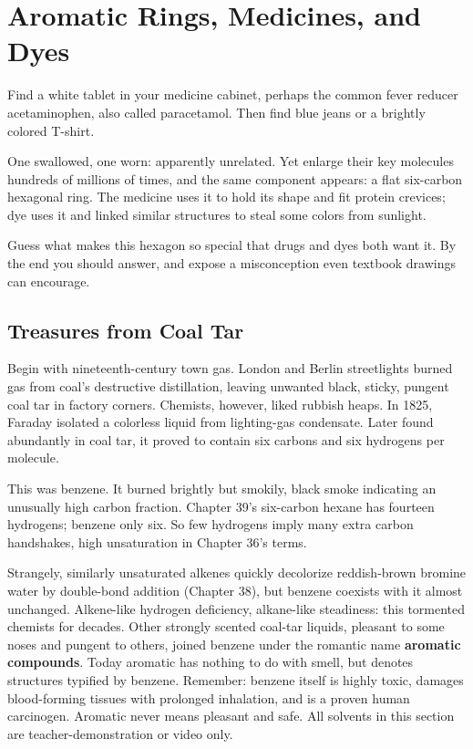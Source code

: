 \chapter{Aromatic Rings, Medicines, and Dyes}

\begin{kaichang}
Find a white tablet in your medicine cabinet, perhaps the common fever reducer acetaminophen, also called paracetamol. Then find blue jeans or a brightly colored T-shirt.

One swallowed, one worn: apparently unrelated. Yet enlarge their key molecules hundreds of millions of times, and the same component appears: a flat six-carbon hexagonal ring. The medicine uses it to hold its shape and fit protein crevices; dye uses it and linked similar structures to steal some colors from sunlight.

Guess what makes this hexagon so special that drugs and dyes both want it. By the end you should answer, and expose a misconception even textbook drawings can encourage.
\end{kaichang}

\section{Treasures from Coal Tar}

Begin with nineteenth-century town gas. London and Berlin streetlights burned gas from coal's destructive distillation, leaving unwanted black, sticky, pungent coal tar in factory corners. Chemists, however, liked rubbish heaps. In 1825, Faraday isolated a colorless liquid from lighting-gas condensate. Later found abundantly in coal tar, it proved to contain six carbons and six hydrogens per molecule.

This was benzene. It burned brightly but smokily, black smoke indicating an unusually high carbon fraction. Chapter 39's six-carbon hexane has fourteen hydrogens; benzene only six. So few hydrogens imply many extra carbon handshakes, high unsaturation in Chapter 36's terms.

Strangely, similarly unsaturated alkenes quickly decolorize reddish-brown bromine water by double-bond addition (Chapter 38), but benzene coexists with it almost unchanged. Alkene-like hydrogen deficiency, alkane-like steadiness: this tormented chemists for decades. Other strongly scented coal-tar liquids, pleasant to some noses and pungent to others, joined benzene under the romantic name \textbf{aromatic compounds}. Today aromatic has nothing to do with smell, but denotes structures typified by benzene. Remember: benzene itself is highly toxic, damages blood-forming tissues with prolonged inhalation, and is a proven human carcinogen. Aromatic never means pleasant and safe. All solvents in this section are teacher-demonstration or video only.

